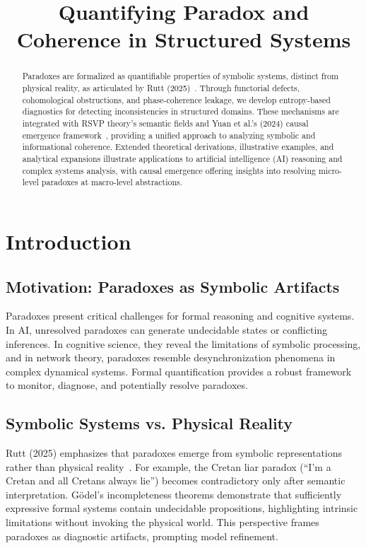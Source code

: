 \documentclass[12pt]{article}
\title{Quantifying Paradox and Coherence in Structured Systems}
\author{}
\date{}
\theoremstyle{plain}
\begin{document}
\maketitle

\begin{abstract}
Paradoxes are formalized as quantifiable properties of symbolic systems, distinct from physical reality, as articulated by Rutt (2025)~\citep{Rutt2025}. Through functorial defects, cohomological obstructions, and phase-coherence leakage, we develop entropy-based diagnostics for detecting inconsistencies in structured domains. These mechanisms are integrated with RSVP theory’s semantic fields and Yuan et al.’s (2024) causal emergence framework~\citep{Yuan2024}, providing a unified approach to analyzing symbolic and informational coherence. Extended theoretical derivations, illustrative examples, and analytical expansions illustrate applications to artificial intelligence (AI) reasoning and complex systems analysis, with causal emergence offering insights into resolving micro-level paradoxes at macro-level abstractions.
\end{abstract}

\section{Introduction}

\subsection{Motivation: Paradoxes as Symbolic Artifacts}

Paradoxes present critical challenges for formal reasoning and cognitive systems. In AI, unresolved paradoxes can generate undecidable states or conflicting inferences. In cognitive science, they reveal the limitations of symbolic processing, and in network theory, paradoxes resemble desynchronization phenomena in complex dynamical systems. Formal quantification provides a robust framework to monitor, diagnose, and potentially resolve paradoxes.

\subsection{Symbolic Systems vs. Physical Reality}

Rutt (2025) emphasizes that paradoxes emerge from symbolic representations rather than physical reality~\citep{Rutt2025}. For example, the Cretan liar paradox (“I’m a Cretan and all Cretans always lie”) becomes contradictory only after semantic interpretation. Gödel’s incompleteness theorems demonstrate that sufficiently expressive formal systems contain undecidable propositions, highlighting intrinsic limitations without invoking the physical world. This perspective frames paradoxes as diagnostic artifacts, prompting model refinement.
\end{document}
